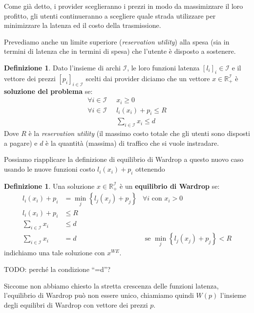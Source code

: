 \documentclass[a4paper]{article}
\newcounter{counter1}
\theoremstyle{plain}
\theoremstyle{definition}
\newtheorem{mydef}[counter1]{Definizione}
\theoremstyle{remark}
\newcommand{\set}[1]{\left\{#1\right\}}
\newcommand{\pa}[1]{\left(#1\right)}
\newcommand{\bra}[1]{\left[#1\right]}
\begin{document}
Come già detto, i provider sceglieranno i prezzi in modo da
massimizzare il loro profitto, gli utenti continueranno a scegliere
quale strada utilizzare per minimizzare la latenza ed il costo della
trasmissione.

Prevediamo anche un limite superiore (\textit{reservation utility})
alla spesa (sia in termini di latenza che in termini di spesa) che
l'utente è disposto a sostenere.

\begin{mydef}
  Dato l'insieme di archi $\mathcal{I}$, le loro funzioni
  latenza $\bra{l_i}_i\in\mathcal{I}$ e il vettore dei prezzi
  $\bra{p_i}_{i\in\mathcal{I}}$ scelti dai provider diciamo che un
  vettore $x\in \mathbb{R}_+^\mathcal{I}$ è \textbf{soluzione del
    problema} se:
  \begin{align*}
    \forall i\in \mathcal{I}\;\; & x_i \ge 0 \\
    \forall i\in \mathcal{I}\;\; & l_i(x_i) + p_i \le R \\
    & \sum _{i\in \mathcal{I}} x_i \le d 
  \end{align*}
  Dove $R$ è la \textit{reservation utility} (il massimo costo totale
  che gli utenti sono disposti a pagare) e $d$ è la quantità (massima)
  di traffico che si vuole instradare.
\end{mydef}

Possiamo riapplicare la definizione di equilibrio di Wardrop a questo
nuovo caso usando le nuove funzioni costo $l_i\pa{x_i} + p_i$ ottenendo

\begin{mydef}
  Una soluzione $x\in \mathbb{R}_+^\mathcal{I}$ è un
  \textbf{equilibrio di Wardrop} se:
  \begin{align*}
    l_i(x_i) + p_i &= \min _j \set{l_j(x_j)+p_j} & \forall i\text{ con } x_i>0 \\
    l_i(x_i) + p_i &\le R \\
    \sum _{i\in \mathcal{I}} x_i &\le d \\
    \sum _{i\in \mathcal{I}} x_i &= d & \text { se } \min _j
                                        \set{l_j(x_j)+p_j} <R
  \end{align*}
  indichiamo una tale soluzione con $x^{WE}$.
\end{mydef}

TODO: perché la condizione ``=d''?

Siccome non abbiamo chiesto la stretta crescenza delle funzioni
latenza, l'equilibrio di Wardrop può non essere unico, chiamiamo
quindi $W(p)$ l'insieme degli equilibri di Wardrop con vettore
dei prezzi $p$.
\end{document}
